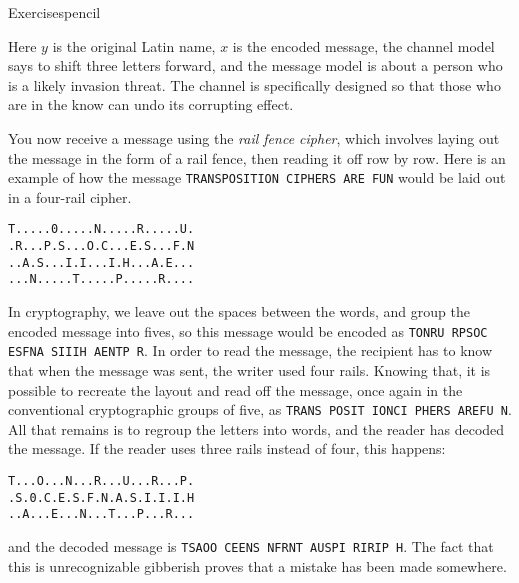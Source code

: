 \begin{tblsfilledsymbol}{Exercises}{pencil}
\begin{enumerate}
Here
\(y\) is the original Latin name, \(x\) is the encoded message, the
channel model says to shift three letters forward, and the message
model is about a person who is a likely invasion threat. The channel is
specifically designed so that those who are in the know can undo its
corrupting effect.   

You now receive a message using the \emph{rail fence cipher}, which involves laying
out the message in the form of a rail fence, then reading it off row by row.
Here is an example of how the message \texttt{TRANSPOSITION CIPHERS ARE FUN}
would be laid out in a four-rail cipher.
\begin{verbatim}
T.....0.....N.....R.....U.
.R...P.S...O.C...E.S...F.N
..A.S...I.I...I.H...A.E...
...N.....T.....P.....R....
\end{verbatim}
In cryptography, we leave out the spaces between the words, and group the encoded message into fives, so
this message would be encoded as \texttt{TONRU RPSOC ESFNA SIIIH AENTP R}.
In order to read the message, the recipient has to know that when the message was sent, the writer used
four rails. Knowing that, it is possible to recreate the layout and read off the message, once again in the conventional
cryptographic groups of five, as 
\texttt{TRANS POSIT IONCI PHERS AREFU N}. All that remains is to regroup the letters into words, and the reader has decoded
the message.
If the reader uses three rails instead of four, this happens:
\begin{verbatim}
T...O...N...R...U...R...P.
.S.0.C.E.S.F.N.A.S.I.I.I.H
..A...E...N...T...P...R...
\end{verbatim}
and the decoded message is \texttt{TSAOO CEENS NFRNT AUSPI RIRIP H}. The fact that this is 
unrecognizable gibberish
proves that a mistake has been made somewhere.


\end{enumerate}
\end{tblsfilledsymbol}
